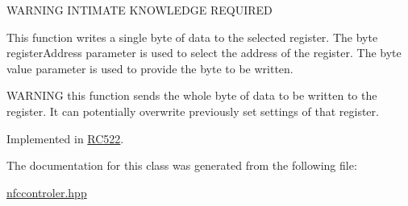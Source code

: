 W\+A\+R\+N\+I\+NG I\+N\+T\+I\+M\+A\+TE K\+N\+O\+W\+L\+E\+D\+GE R\+E\+Q\+U\+I\+R\+ED

This function writes a single byte of data to the selected register. The \textquotesingle{}byte register\+Address\textquotesingle{} parameter is used to select the address of the register. The \textquotesingle{}byte value\textquotesingle{} parameter is used to provide the byte to be written.

W\+A\+R\+N\+I\+NG this function sends the whole byte of data to be written to the register. It can potentially overwrite previously set settings of that register. 

Implemented in \hyperlink{class_r_c522_a8860f482253b39808658bf5cdbbe342d}{R\+C522}.



The documentation for this class was generated from the following file\+:\begin{DoxyCompactItemize}
\item 
\hyperlink{nfccontroler_8hpp}{nfccontroler.\+hpp}\end{DoxyCompactItemize}
